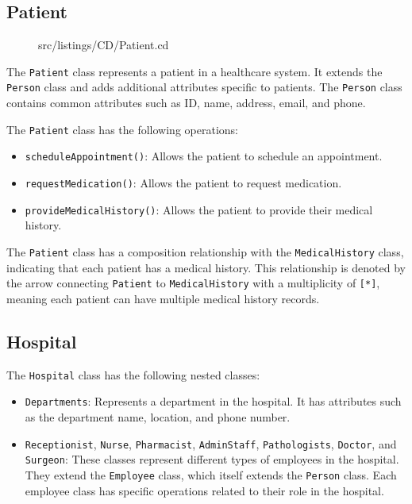 \subsection{Patient}
\begin{figure}[hbt]
\lstset{language=MontiArc}
 {src/listings/CD/Patient.cd}
\end{figure}

The \texttt{Patient} class represents a patient in a healthcare system. It extends the \texttt{Person} class and adds additional attributes specific to patients. The \texttt{Person} class contains common attributes such as ID, name, address, email, and phone.

The \texttt{Patient} class has the following operations:
\begin{itemize}
  \item \texttt{scheduleAppointment()}: Allows the patient to schedule an appointment.
  \item \texttt{requestMedication()}: Allows the patient to request medication.
  \item \texttt{provideMedicalHistory()}: Allows the patient to provide their medical history.
\end{itemize}

The \texttt{Patient} class has a composition relationship with the \texttt{MedicalHistory} class, indicating that each patient has a medical history. This relationship is denoted by the arrow connecting \texttt{Patient} to \texttt{MedicalHistory} with a multiplicity of \texttt{[*]}, meaning each patient can have multiple medical history records.

\subsection{Hospital}



The \texttt{Hospital} class has the following nested classes:
\begin{itemize}
  \item \texttt{Departments}: Represents a department in the hospital. It has attributes such as the department name, location, and phone number.
  \item \texttt{Receptionist}, \texttt{Nurse}, \texttt{Pharmacist}, \texttt{AdminStaff}, \texttt{Pathologists}, \texttt{Doctor}, and \texttt{Surgeon}: These classes represent different types of employees in the hospital. They extend the \texttt{Employee} class, which itself extends the \texttt{Person} class. Each employee class has specific operations related to their role in the hospital.
\end{itemize}



